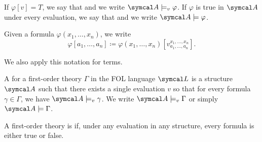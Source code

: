 \begin{definition}
  If \( \varphi[v] = T \), we say that  and we write \( \Cal{A} \models_v \varphi \). If \( \varphi \) is true in \( \Cal{A} \) under every evaluation, we say that  and we write \( \Cal{A} \models \varphi \).

  Given a formula \( \varphi(x_1, \ldots, x_n) \), we write
  \begin{equation*}
    \varphi[a_1, \ldots, a_n] \coloneqq \varphi(x_1, \ldots, x_n)[v_{a_1, \ldots, a_n}^{x_1, \ldots, x_n}].
  \end{equation*}

  We also apply this notation for terms.
\end{definition}

\begin{definition}\label{def:first_order_model}\cite[definition 4.4]{Nerode2012}
  A  for a first-order theory \( \Gamma \) in the FOL language \( \Cal{L} \) is a structure \( \Cal{A} \) such that there exists a single evaluation \( v \) so that for every formula \( \gamma \in \Gamma \), we have \( \Cal{A} \models_v \gamma \). We write \( \Cal{A} \models_v \Gamma \) or simply \( \Cal{A} \models \Gamma \).
\end{definition}

\begin{definition}\label{def:first_order_consistency}
  A first-order theory is  if, under any evaluation in any structure, every formula is either true or false.
\end{definition}

